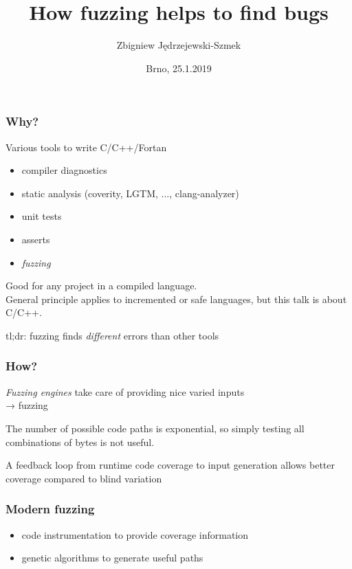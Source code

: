 \documentclass[serif]{beamer}
\title{How fuzzing helps to find bugs}
\author{Zbigniew Jędrzejewski-Szmek}
\institute{%
  \texttt{[image: beamer-themeredhat/redhat.png]}\\
  \medskip
  \textit{zbyszek@in.waw.pl}\\
  \medskip
  \ccbysa
}
\date{\tiny Brno, 25.1.2019}
\begin{document}
\begin{frame}
\titlepage %
\end{frame}

\begin{frame}
  \frametitle{Why?}

  Various tools to write C/C++/Fortan
  \begin{itemize}
  \item compiler diagnostics
  \item static analysis (coverity, LGTM, ..., clang-analyzer)
  \item unit tests
  \item asserts
  \item \emph{fuzzing}
  \end{itemize}

  \bigskip
  
  \tiny
  Good for any project in a compiled language.\\
  General principle applies to incremented or safe languages, but this talk is about C/C++.
\end{frame}

\begin{frame}
    tl;dr: fuzzing finds \emph{different} errors than other tools
\end{frame}

\begin{frame}
  \frametitle{How?}

  \emph{Fuzzing engines}
  take care of providing nice varied inputs \\
  → fuzzing

  \medskip

  \tiny
  The number of possible code paths is exponential, so simply testing
  all combinations of bytes is not useful.

  A feedback loop from runtime code coverage to input generation
  allows better coverage compared to blind variation
\end{frame}

\begin{frame}
  \frametitle{Modern fuzzing}

  \begin{itemize}
  \item code instrumentation to provide coverage information
  \item genetic algorithms to generate useful paths
  \end{itemize}

\end{frame}
\end{document}
